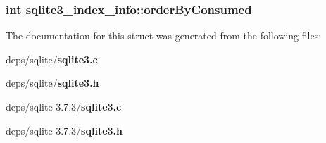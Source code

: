 \subsubsection{\setlength{\rightskip}{0pt plus 5cm}int \bf{sqlite3\_\-index\_\-info::order\-By\-Consumed}}\label{structsqlite3__index__info_26bd4015f0dabf9fc59d3195ae8c2d3d}




The documentation for this struct was generated from the following files:\begin{CompactItemize}
\item 
deps/sqlite/\bf{sqlite3.c}\item 
deps/sqlite/\bf{sqlite3.h}\item 
deps/sqlite-3.7.3/\bf{sqlite3.c}\item 
deps/sqlite-3.7.3/\bf{sqlite3.h}\end{CompactItemize}

